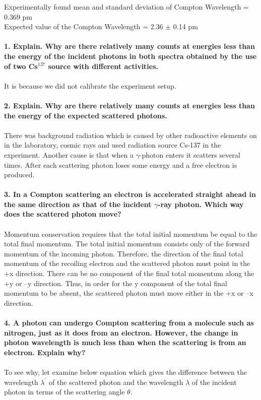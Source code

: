 \documentclass[a4paper,12pt]{article}
\begin{document}
Experimentally found mean and standard deviation of Compton Wavelength = 0.369 pm\\
Expected value of the Compton Wavelength = 2.36 $\pm $ 0.14 pm\\\\
\textbf{1. Explain. Why are there relatively many counts at energies less than the energy of the incident photons in both spectra obtained by the use of two Cs$^{137}$ source with different activities.}\\\\
It is because we did not calibrate the experiment setup.\\\\
\textbf{2. Explain. Why are there relatively many counts at energies less than the energy of the expected scattered photons.}\\\\
There was background radiation which is caused by other radioactive elements on in the laboratory, cosmic rays and used radiation source Cs-137 in the experiment. Another cause is that when a $\gamma$-photon enters it scatters several times. After each scattering photon loses some energy and a free electron is produced. \\\\
\textbf{3. In a Compton scattering an electron is accelerated straight ahead in the same direction as that of the incident $\gamma$-ray photon. Which way does the scattered photon move?}\\\\
Momentum conservation requires that the total initial momentum be equal to the total final momentum. The total initial momentum consists only of the forward momentum of the incoming photon. Therefore, the direction of the final total momentum of the recoiling electron and the scattered photon must point in the +x direction.  There can be no component of the final total momentum along the +y or –y direction. Thus, in order for the y component of the total final momentum to be absent, the scattered photon must move either in the +x or –x direction.\\\\
\textbf{4. A photon can undergo Compton scattering from a molecule such as nitrogen, just as it does from an electron. However, the change in photon wavelength is much less than when the scattering is from an electron. Explain why?}\\\\
To see why, let examine below equation which gives the difference between the wavelength $\lambda^{\prime}$ of the scattered photon and the wavelength $\lambda$ of the incident photon in terms of the scattering angle $\theta$. 
\end{document}
